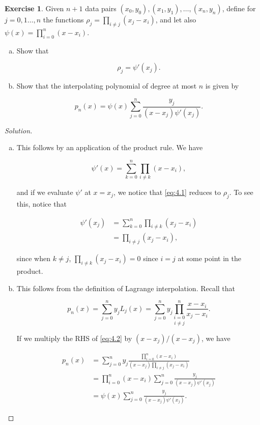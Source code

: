 \documentclass[12pt,a4]{article}
\theoremstyle{definition}
\newtheorem{exercise}{Exercise}
\begin{document}
\begin{exercise}
	Given $n + 1$  data pairs $(x_0, y_0), (x_1, y_1), \ldots, (x_n, y_n)$, define for $j = 0, 1 \ldots, n$ the functions $\rho_j = \prod_{i \neq j} (x_j - x_i)$, and let also $\psi(x) = \prod_{i = 0}^n (x - x_i)$. 
	
	\begin{enumerate}[(a)]
		\item Show that 
		
		\[
		\rho_j = \psi'(x_j) {.}
		\]
		
		\item Show that the interpolating polynomial of degree at most $n$ is given by 
		
		\[
		p_n(x) = \psi(x) \sum_{j = 0}^{n} \frac{y_j}{(x - x_j)\psi'(x_j)} {.}
		\]
	\end{enumerate}
\end{exercise}
\begin{proof}[Solution]
	\begin{enumerate}[(a)]
		\item This follows by an application of the product rule. We have
		
		\[
		\psi'(x) = \sum_{k = 0}^n \prod_{i \neq k} (x - x_i) {,} \tag{4.1} \label{eq:4.1}
		\]
		
		and if we evaluate $\psi'$ at $x = x_j$, we notice that \hyperref[eq:4.1]{\eqref{eq:4.1}} reduces to $\rho_j$. To see this, notice that 
		
		\begin{align*}
		\psi'(x_j) &= \sum_{k = 0}^n \prod_{i \neq k} (x_j - x_i) \\
		 &= \prod_{i \neq j} (x_j - x_i) {,}
		\end{align*}
		
		since when $k \neq j$, $\prod_{i \neq k} (x_j - x_i) = 0$ since $i = j$ at some point in the product. 
		
		\item This follows from the definition of Lagrange interpolation. Recall that 
		
		\[
		p_n(x) = \sum_{j = 0}^n y_j L_j(x) = \sum_{j = 0}^n y_j \underset{i \neq j}{\prod_{i = 0}^n} \frac{x - x_i}{x_j - x_i} {.} \tag{4.2} \label{eq:4.2}
		\]
		
		If we multiply the RHS of \hyperref[eq:4.2]{\eqref{eq:4.2}} by $(x - x_j) / (x - x_j)$, we have
		
		\begin{align*}
		p_n(x) &= \sum_{j = 0}^n y_j \frac{\prod_{i = 0}^n (x - x_i)}{(x - x_j) \prod_{i \neq j} (x_j - x_i)} \\
		&= \prod_{i = 0}^n (x - x_i) \sum_{j = 0}^n \frac{y_j}{(x - x_j) \psi'(x_j)} \tag{using (a)} \\
		&= \psi(x) \sum_{j = 0}^n \frac{y_j}{(x - x_j) \psi'(x_j)} {.}
		\end{align*}
		
		
	\end{enumerate}
\end{proof}
\end{document}
